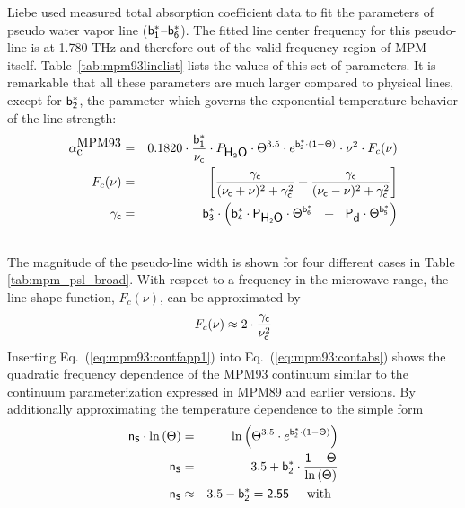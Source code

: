 {
\label{levele:mpm93:h2ocont}
Liebe used measured total absorption coefficient data to fit the 
parameters of pseudo water vapor line ($\sf b^*_{\sf 1}$--$\sf b^*_{\sf 6}$). 
The fitted line center frequency for this pseudo-line is at 
1.780 THz and therefore out of the valid frequency region of MPM 
itself. Table~\ref{tab:mpm93linelist} lists the values of this set 
of parameters. It is remarkable that all these parameters are much 
larger compared to physical lines, except for $\sf b^*_{\sf 2}$, the parameter 
which governs the exponential temperature behavior of the line strength:
\begin{eqnarray}
  \label{eq:mpm93:contabs}
  \alphampmnc & = & 0.1820 \cdot \frac{\beks}{\nucc} \cdot \phzo \cdot 
                \Theta^{3.5} \cdot e^{\bzks\cdot(1-\Theta)} \cdot 
                \nu^2 \cdot F_c(\nu)\\
%
  \label{eq:mpm93:contabs1}
  F_c(\nu) & = & \left[\frac{\gamc}{(\nucc+\nu)^2+\gamc^2} + 
                       \frac{\gamc}{(\nucc-\nu)^2+\gamc^2}\right]\\
%
  \label{eq:mpm93:contabs2}
  \gamc & = &  \bdks \cdot 
          \left(\bvks \cdot \phzo \cdot \Theta^{\bsks}~~+~~ 
                            \pda  \cdot \Theta^{\bfks}\right)\\
\nonumber
\end{eqnarray}
The magnitude of the pseudo-line width is shown for four different 
cases in Table\,\ref{tab:mpm_psl_broad}. With respect to a frequency
in the microwave range, the line shape function, $F_c(\nu)$, can be 
approximated by
\begin{equation}
 \label{eq:mpm93:contfapp1}
 F_c(\nu) \approx 2 \cdot \frac{\gamma_{\sf c}}{\nu_{\sf c}^2}
\end{equation}
Inserting Eq.~(\ref{eq:mpm93:contfapp1}) into Eq.~(\ref{eq:mpm93:contabs})
shows the quadratic frequency dependence of the MPM93 continuum
similar to the continuum parameterization expressed in MPM89 and earlier 
versions. By additionally approximating the temperature dependence to the 
simple form
\begin{eqnarray}
  \xs\cdot\ln{(\Theta)} & = & 
  \ln{\left(\Theta^{3.5} \cdot e^{\bzks\cdot(1-\Theta)}\right)}\nonumber\\
%
  \xs  & = & 3.5 +
  \bzks\cdot\frac{1-\Theta}{\ln{(\Theta)}}\nonumber\\
%
  \xs & \approx & 3.5 -\bzks = 2.55\hspace*{5mm}\mbox{with}\hspace*{2mm}

\end{eqnarray}}
